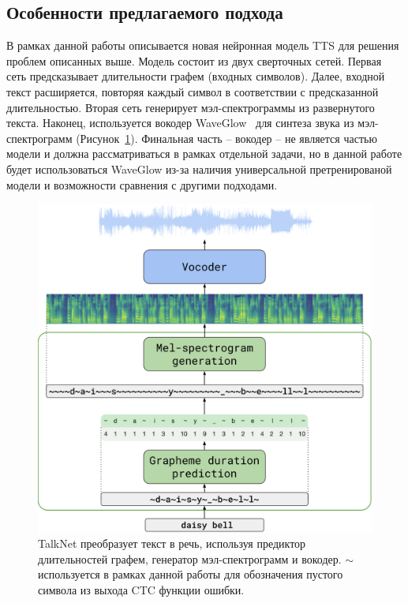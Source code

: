 \subsection{Особенности предлагаемого подхода}

В рамках данной работы описывается новая нейронная модель TTS для решения проблем описанных выше. Модель состоит из двух сверточных сетей. Первая сеть предсказывает длительности графем (входных символов). Далее, входной текст расширяется, повторяя каждый символ в соответствии с предсказанной длительностью. Вторая сеть генерирует мэл-спектрограммы из развернутого текста. Наконец, используется вокодер WaveGlow~\cite{waveglow} для синтеза звука из мэл-спектрограмм (Рисунок~\ref{fig:arch}). Финальная часть -- вокодер -- не является частью модели и должна рассматриваться в рамках отдельной задачи, но в данной работе будет использоваться WaveGlow из-за наличия универсальной претренированой модели и возможности сравнения с другими подходами.

\begin{figure}[!ht]
\centering
\includegraphics[width=1.0\textwidth]{images/arch.png}
\caption{TalkNet преобразует текст в речь, используя предиктор длительностей графем, генератор мэл-спектрограмм и вокодер. $\sim$ используется в рамках данной работы для обозначения пустого символа из выхода CTC функции ошибки.}
\label{fig:arch}
\end{figure}


